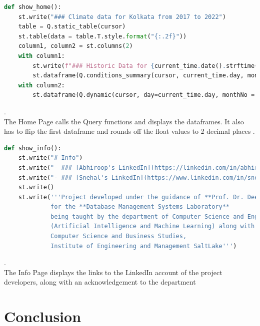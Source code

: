 \documentclass[12pt, a4paper]{article}
\begin{document}
\begin{lstlisting}[language=Python, breaklines=true]
def show_home():
    st.write("### Climate data for Kolkata from 2017 to 2022")
    table = Q.static_table(cursor)
    st.table(data = table.T.style.format("{:.2f}"))
    column1, column2 = st.columns(2)
    with column1:
        st.write(f"### Historic Data for {current_time.date().strftime('%d %B')}")
        st.dataframe(Q.conditions_summary(cursor, current_time.day, monthNo = current_time.month).T)
    with column2:
        st.dataframe(Q.dynamic(cursor, day=current_time.day, monthNo = current_time.month))
\end{lstlisting}
.\\
The Home Page calls the Query functions and displays the dataframes. It also has to flip the first dataframe and rounds off the float values to 2 decimal places
\newpage
.\\

\begin{lstlisting}[language=Python, breaklines=true]
def show_info():
    st.write("# Info")
    st.write("- ### [Abhiroop's LinkedIn](https://linkedin.com/in/abhiroop2004)")
    st.write("- ### [Snehal's LinkedIn](https://www.linkedin.com/in/snehal-ghosh-164a63263)")
    st.write()
    st.write('''Project developed under the guidance of **Prof. Dr. Deepshubhra Guha Roy**
             for the **Database Management Systems Laboratory**
             being taught by the department of Computer Science and Engineering
             (Artificial Intelligence and Machine Learning) along with 
             Computer Science and Business Studies,
             Institute of Engineering and Management SaltLake''')
\end{lstlisting}
.\\

The Info Page displays the links to the LinkedIn account of the project developers, along with an acknowledgement to the department 
\newpage
\section{Conclusion}
\newpage


\end{document}
